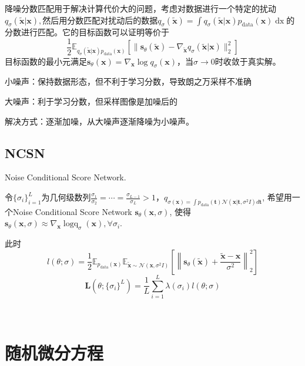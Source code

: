 \documentclass{article}
\newcommand{\nobracket}{}
\newcommand{\tmmathbf}[1]{\ensuremath{\boldsymbol{#1}}}
\newcommand{\tmop}[1]{\ensuremath{\operatorname{#1}}}
\begin{document}
\begin{CJK*}{UTF8}{gbsn}
降噪分数匹配用于解决计算代价大的问题，考虑对数据进行一个特定的扰动$q_{\sigma}
(\tilde{\tmmathbf{x}} | \tmmathbf{x}
\nobracket),$然后用分数匹配对扰动后的数据$q_{\sigma}
(\tilde{\tmmathbf{x}}) = \int q_{\sigma} (\tilde{\tmmathbf{x}} | \tmmathbf{x}
\nobracket) p_{\tmop{data}} (\tmmathbf{x})
\tmop{dx}$的分数进行匹配。它的目标函数可以证明等价于
\[ \frac{1}{2} \mathbb{E}_{q_{\sigma} (\tilde{\tmmathbf{x}} | \tmmathbf{x}
   \nobracket) p_{\tmop{data}} (\tmmathbf{x})} [\| \tmmathbf{s}_{\theta}
   (\tilde{\tmmathbf{x}}) - \nabla_{\tilde{\tmmathbf{x}}} q_{\sigma}
   (\tilde{\tmmathbf{x}} | \tmmathbf{x} \nobracket) \|_2^2] \]
目标函数的最小元满足$\tmmathbf{s}_{\theta} (\tmmathbf{x}) =
\nabla_{\tmmathbf{x}} \log q_{\sigma} (\tmmathbf{x})$，当$\sigma \rightarrow
0$时收敛于真实解。

小噪声：保持数据形态，但不利于学习分数，导致朗之万采样不准确

大噪声：利于学习分数，但采样图像是加噪后的

解决方式：逐渐加噪，从大噪声逐渐降噪为小噪声。

\subsection{NCSN}

Noise Conditional Score Network.

令$\{ \sigma_i \}_{i = 1}^L$为几何级数列$\frac{\sigma_1}{\sigma_2} =
\cdots = \frac{\sigma_{L - 1}}{\sigma_L} > 1$，$q_{\sigma (\tmmathbf{x}) =
\int p_{\tmop{data}} (\tmmathbf{t}) \mathcal{N} (\tmmathbf{x} | \tmmathbf{t},
\sigma^2 I \nobracket) d\tmmathbf{t}}$, 希望用一个Noise Conditional Score
Network $\tmmathbf{s}_{\theta} (\tmmathbf{x}, \sigma)$,
使得$\tmmathbf{s}_{\theta} (\tmmathbf{x}, \sigma) \approx
\nabla_{\tmmathbf{x}} \tmop{logq}_{\sigma} (\tmmathbf{x}), \forall \sigma_i$.

此时
\[ l (\theta ; \sigma) = \frac{1}{2} \mathbb{E}_{p_{\tmop{data}}
   (\tmmathbf{x})} \mathbb{E}_{\tilde{\tmmathbf{x}} \sim \mathcal{N}
   (\tmmathbf{x}, \sigma^2 I)} \left[ \left\| \tmmathbf{s}_{\theta}
   (\tilde{\tmmathbf{x}}) + \frac{\tilde{\tmmathbf{x}}
   -\tmmathbf{x}}{\sigma^2} \right\|_2^2 \right] \]
\[ \tmmathbf{L} (\theta ; \{ \sigma_i \}^L) = \frac{1}{L} \sum_{i = 1}^L
   \lambda (\sigma_i) l (\theta ; \sigma) \]


\

\section{随机微分方程}


\end{CJK*}
\end{document}
